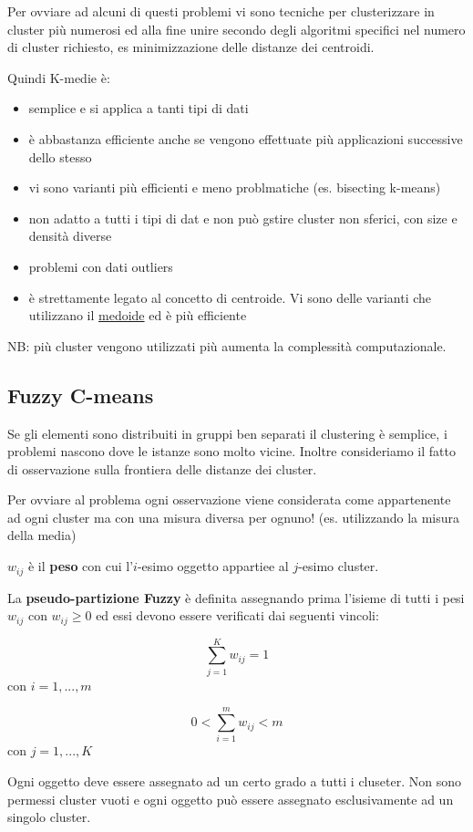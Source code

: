 Per ovviare ad alcuni di questi problemi vi sono tecniche per clusterizzare in cluster pi\`u numerosi ed alla fine unire secondo degli algoritmi specifici nel numero di cluster richiesto, es minimizzazione delle distanze dei centroidi. 

Quindi K-medie \`e:
\begin{itemize}
	\item semplice e si applica a tanti tipi di dati
	\item \`e abbastanza efficiente anche se vengono effettuate pi\`u applicazioni successive dello stesso
	\item vi sono varianti pi\`u efficienti e meno problmatiche (es. bisecting k-means)
	\item non adatto a tutti i tipi di dat e non pu\`o gstire cluster non sferici, con size e densit\`a diverse
	\item problemi con dati outliers
	\item \`e strettamente legato al concetto di centroide. Vi sono delle varianti che utilizzano il \underline{medoide} ed \`e pi\`u efficiente
	
	
\end{itemize}
NB: pi\`u cluster vengono utilizzati pi\`u aumenta la complessit\`a computazionale.


\subsection{Fuzzy C-means}
Se gli elementi sono distribuiti in gruppi ben separati il clustering \`e semplice, i problemi nascono dove le istanze sono molto vicine. Inoltre consideriamo il fatto di osservazione sulla frontiera delle distanze dei cluster. 

Per ovviare al problema ogni osservazione viene considerata come appartenente ad ogni cluster ma con una misura diversa per ognuno! (es. utilizzando la misura della media)

$w_{ij}$ \`e il \textbf{peso} con cui l'$i$-esimo oggetto appartiee al $j$-esimo cluster.

La \textbf{pseudo-partizione Fuzzy} \`e definita assegnando prima l'isieme di tutti i pesi $w_{ij}$ con $w_{ij} \geq 0$ ed essi devono essere verificati dai seguenti vincoli:

\[\sum_{j=1}^{K} w_{ij} = 1\] con $i = 1, ..., m$

\[ 0 < \sum_{i=1}^{m}w_{ij} < m\] con $j = 1, ..., K$

Ogni oggetto deve essere assegnato ad un certo grado a tutti i cluseter. Non sono permessi cluster vuoti e ogni oggetto pu\`o essere assegnato esclusivamente ad un singolo cluster.


